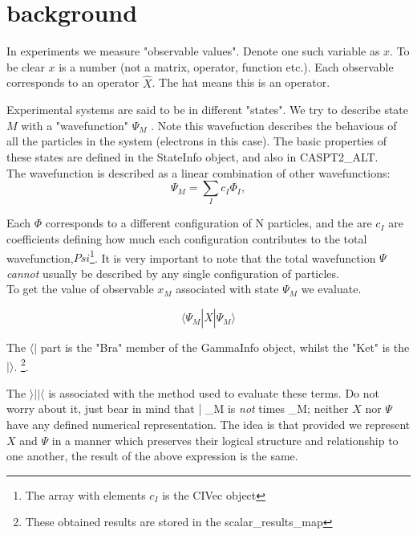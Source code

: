\documentclass[12pt]{article}
\begin{document}
\section{background}

In experiments we measure "observable values". Denote one such variable as $x$.
To be clear $x$ is a number (not a matrix, operator, function  etc.). Each
observable corresponds to an operator $\hat{X}$. The hat$\hat{ }$ means this is
an operator.

Experimental systems are said to be in different "states". We try to describe
state $M$ with a "wavefunction" $\Psi_{M}$ . Note this wavefuction describes
the behavious of all the particles in the system (electrons in this case).  The
basic properties of these states are defined in the StateInfo object, and also
in CASPT2_ALT. \\

The wavefunction is described as a linear combination of other wavefunctions:
\begin{equation}
\Psi_{M} = \sum_{I} c_{I}\Phi_{I},
\label {eqn:CI_wfn}
\end{equation}

Each $\Phi$ corresponds to a different configuration of N particles, and the
are $c_{I}$ are
coefficients defining how much each configuration contributes to the  total
wavefunction,$Psi$\footnote{The array with elements $c_{I}$ is the CIVec
object}.
 It is very important to note that the total wavefunction $\Psi$
\emph{cannot} usually be described by any single configuration of particles. \\ 

To get the value of observable $x_{M}$ associated with state $\Psi_{M}$ we evaluate.

\begin{equation}
\langle \Psi_{M} | \hat{X} | \Psi_{M} \rangle
\end{equation}

The $\langle |$ part is the "Bra" member of the GammaInfo object, whilst the "Ket" is the $| \rangle$.
\footnote{These obtained results are stored in the scalar_results_map}.

The $\rangle | | \langle$ is associated with the method used to evaluate these
terms.  Do not worry about it, just bear in mind that  | \Psi_{M}
\rangle is \emph{not}  times \Psi_{M}; neither $X$ nor $\Psi$ have any
defined numerical representation. The idea is that provided we represent $X$
and $\Psi$ in a manner which preserves their logical structure and relationship
to one another, the result of the above expression is the same. \\
 
\end{document}
